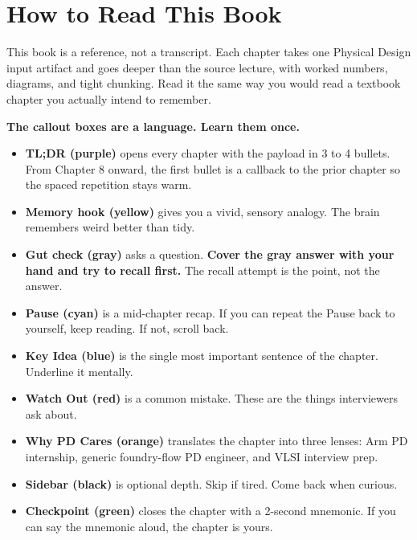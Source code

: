 



\frontmatter
\maketitle

\chapter*{How to Read This Book}

This book is a reference, not a transcript. Each chapter takes one Physical Design input artifact and goes deeper than the source lecture, with worked numbers, diagrams, and tight chunking. Read it the same way you would read a textbook chapter you actually intend to remember.

\bigskip
\noindent\textbf{The callout boxes are a language. Learn them once.}

\begin{itemize}[leftmargin=*]
  \item \textbf{TL;DR (purple)} opens every chapter with the payload in 3 to 4 bullets. From Chapter 8 onward, the first bullet is a callback to the prior chapter so the spaced repetition stays warm.
  \item \textbf{Memory hook (yellow)} gives you a vivid, sensory analogy. The brain remembers weird better than tidy.
  \item \textbf{Gut check (gray)} asks a question. \textbf{Cover the gray answer with your hand and try to recall first.} The recall attempt is the point, not the answer.
  \item \textbf{Pause (cyan)} is a mid-chapter recap. If you can repeat the Pause back to yourself, keep reading. If not, scroll back.
  \item \textbf{Key Idea (blue)} is the single most important sentence of the chapter. Underline it mentally.
  \item \textbf{Watch Out (red)} is a common mistake. These are the things interviewers ask about.
  \item \textbf{Why PD Cares (orange)} translates the chapter into three lenses: Arm PD internship, generic foundry-flow PD engineer, and VLSI interview prep.
  \item \textbf{Sidebar (black)} is optional depth. Skip if tired. Come back when curious.
  \item \textbf{Checkpoint (green)} closes the chapter with a 2-second mnemonic. If you can say the mnemonic aloud, the chapter is yours.
\end{itemize}

